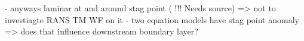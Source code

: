\label{chap:chap_00X_CommentOnStagPoint}
- anyways laminar at and around stag point ( !!! Needs source) => not to investiagte RANS TM WF on it
- two equation models have stag point anomaly => does that influence downstream boundary layer?